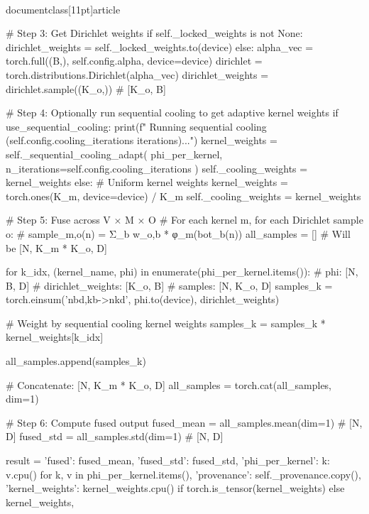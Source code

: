 \\documentclass[11pt]{article}
\begin{document}
\begin{CodeBlock}
{{{{        # Step 3: Get Dirichlet weights
        if self._locked_weights is not None:
            dirichlet_weights = self._locked_weights.to(device)
        else:
            alpha_vec = torch.full((B,), self.config.alpha, device=device)
            dirichlet = torch.distributions.Dirichlet(alpha_vec)
            dirichlet_weights = dirichlet.sample((K_o,))  # [K_o, B]
        
        # Step 4: Optionally run sequential cooling to get adaptive kernel weights
        if use_sequential_cooling:
            print(f"  Running sequential cooling ({self.config.cooling_iterations} iterations)...")
            kernel_weights = self._sequential_cooling_adapt(
                phi_per_kernel, 
                n_iterations=self.config.cooling_iterations
            )
            self._cooling_weights = kernel_weights
        else:
            # Uniform kernel weights
            kernel_weights = torch.ones(K_m, device=device) / K_m
            self._cooling_weights = kernel_weights
        
        # Step 5: Fuse across V × M × O
        # For each kernel m, for each Dirichlet sample o:
        #   sample_{m,o}(n) = Σ_b w_{o,b} * φ_m(bot_b(n))
        all_samples = []  # Will be [N, K_m * K_o, D]
        
        for k_idx, (kernel_name, phi) in enumerate(phi_per_kernel.items()):
            # phi: [N, B, D]
            # dirichlet_weights: [K_o, B]
            # samples: [N, K_o, D]
            samples_k = torch.einsum('nbd,kb->nkd', phi.to(device), dirichlet_weights)
            
            # Weight by sequential cooling kernel weights
            samples_k = samples_k * kernel_weights[k_idx]
            
            all_samples.append(samples_k)
        
        # Concatenate: [N, K_m * K_o, D]
        all_samples = torch.cat(all_samples, dim=1)
        
        # Step 6: Compute fused output
        fused_mean = all_samples.mean(dim=1)  # [N, D]
        fused_std = all_samples.std(dim=1)    # [N, D]
        
        result = {
            'fused': fused_mean,
            'fused_std': fused_std,
            'phi_per_kernel': {k: v.cpu() for k, v in phi_per_kernel.items()},
            'provenance': self._provenance.copy(),
            'kernel_weights': kernel_weights.cpu() if torch.is_tensor(kernel_weights) else kernel_weights,
        }
        
}}}}
\end{CodeBlock}
\end{document}
